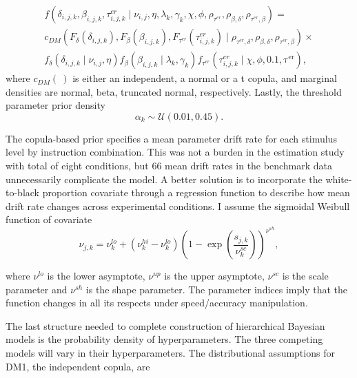 \documentclass[12pt]{article}
\begin{document}
{{{{{{{{{\begin{gather}
f(\delta_{i,j,k},\beta_{i,j,k},\tau_{i,j,k}^{er} \mid \nu_{i,j},\eta,\lambda_k,\gamma_k,\chi,\phi,\rho_{\tau^{er}},\rho_{\beta,\delta},\rho_{\tau^{er},\beta}) = \nonumber \\
c_{DM}\left(F_{\delta}(\delta_{i,j,k}),F_{\beta}(\beta_{i,j,k}),F_{\tau^{er}}(\tau_{i,j,k}^{er}) \mid \rho_{\tau^{er},\delta},\rho_{\beta,\delta},\rho_{\tau^{er},\beta}\right)
\times \nonumber \\
f_{\delta}(\delta_{i,j,k} \mid \nu_{i,j},\eta)f_{\beta}(\beta_{i,j,k} \mid \lambda_k, \gamma_k)f_{\tau^{er}}(\tau_{i,j,k}^{er} \mid \chi, \phi, 0.1, \operatorname{\tau^{er}}),
\end{gather}
where $c_{DM}(\:)$ is either an independent, a normal or a t copula, and marginal densities are normal, beta, truncated normal, respectively. Lastly, the threshold parameter prior density
\begin{equation}
\alpha_k \sim \mathcal{U}(0.01, 0.45).
\end{equation}

	The copula-based prior specifies a mean parameter drift rate for each stimulus level by instruction combination. This was not a burden in the estimation study with total of eight conditions, but 66 mean drift rates in the benchmark data unnecessarily complicate the model. A better solution is to incorporate the white-to-black proportion covariate through a regression function to describe how mean drift rate changes across experimental conditions. I assume the sigmoidal Weibull function of covariate   
\begin{equation}
\nu_{j,k} = \nu_k^{lo}+\left(\nu_k^{hi}-\nu_k^{lo}\right)   \left( 
1 - \operatorname{exp} 
\left( 
\frac{s_{j,k}}{\nu_k^{sc}} 
\right)
\right)^{\nu^{sh}},
\end{equation}

\noindent where $\nu^{lo}$ is the lower asymptote, $\nu^{up}$ is the upper asymptote, $\nu^{sc}$ is the scale parameter and $\nu^{sh}$ is the shape parameter. The parameter indices imply that the function changes in all its respects under speed/accuracy manipulation.

	The last structure needed to complete construction of hierarchical Bayesian models is the probability density of hyperparameters. The three competing models will vary in their hyperparameters. The distributional assumptions for DM1, the independent copula, are
    
}}}}}}}}}
\end{document}
